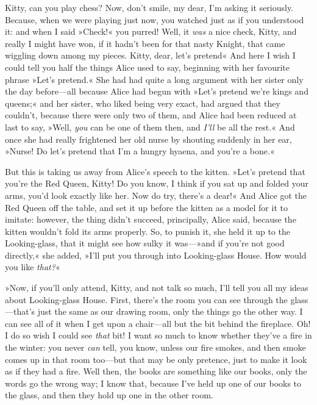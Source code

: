 Kitty, can you play chess? Now, don't smile, my dear, I'm asking it seriously. Because, when we were playing just now, you watched just as if you understood it: and when I said »Check!« you purred! Well, it \textit{was} a nice check, Kitty, and really I might have won, if it hadn't been for that nasty Knight, that came wiggling down among my pieces. Kitty, dear, let's pretend\longdash« And here I wish I could tell you half the things Alice used to say, beginning with her favourite phrase »Let's pretend.« She had had quite a long argument with her sister only the day before—all because Alice had begun with »Let's pretend we're kings and queens;« and her sister, who liked being very exact, had argued that they couldn't, because there were only two of them, and Alice had been reduced at last to say, »Well, \textit{you} can be one of them then, and \textit{I'll} be all the rest.« And once she had really frightened her old nurse by shouting suddenly in her ear, »Nurse! Do let's pretend that I'm a hungry hyaena, and you're a bone.«

But this is taking us away from Alice's speech to the kitten. »Let's pretend that you're the Red Queen, Kitty! Do you know, I think if you sat up and folded your arms, you'd look exactly like her. Now do try, there's a dear!« And Alice got the Red Queen off the table, and set it up before the kitten as a model for it to imitate: however, the thing didn't succeed, principally, Alice said, because the kitten wouldn't fold its arms properly. So, to punish it, she held it up to the Looking-glass, that it might see how sulky it was—»and if you're not good directly,« she added, »I'll put you through into Looking-glass House. How would you like \textit{that?}«

»Now, if you'll only attend, Kitty, and not talk so much, I'll tell you all my ideas about Looking-glass House. First, there's the room you can see through the glass—that's just the same as our drawing room, only the things go the other way. I can see all of it when I get upon a chair—all but the bit behind the fireplace. Oh! I do so wish I could see \textit{that} bit! I want so much to know whether they've a fire in the winter: you never \textit{can} tell, you know, unless our fire smokes, and then smoke comes up in that room too—but that may be only pretence, just to make it look as if they had a fire. Well then, the books are something like our books, only the words go the wrong way; I know that, because I've held up one of our books to the glass, and then they hold up one in the other room.

